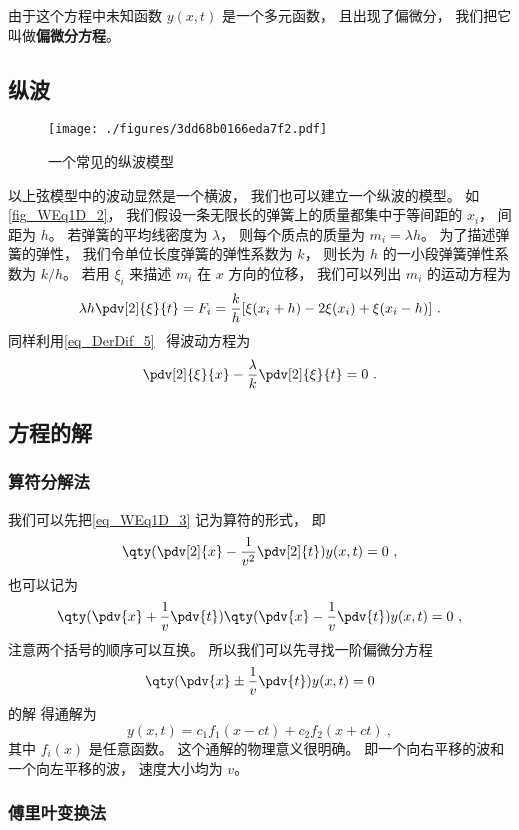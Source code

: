 由于这个方程中未知函数 $y(x,t)$ 是一个多元函数， 且出现了偏微分， 我们把它叫做\textbf{偏微分方程}。

\subsection{纵波}

\begin{figure}[ht]
\centering
\texttt{[image: ./figures/3dd68b0166eda7f2.pdf]}
\caption{一个常见的纵波模型} \label{fig_WEq1D_2}
\end{figure}

以上弦模型中的波动显然是一个横波， 我们也可以建立一个纵波的模型。 如\autoref{fig_WEq1D_2}， 我们假设一条无限长的弹簧上的质量都集中于等间距的 $x_i$， 间距为 $h$。 若弹簧的平均线密度为 $\lambda$， 则每个质点的质量为 $m_i = \lambda h$。 为了描述弹簧的弹性， 我们令单位长度弹簧的弹性系数为 $k$， 则长为 $h$ 的一小段弹簧弹性系数为 $k/h$。 若用 $\xi_i$ 来描述 $m_i$ 在 $x$ 方向的位移， 我们可以列出 $m_i$ 的运动方程为
\begin{equation}
\lambda h \pdv[2]{\xi}{t} = F_i = \frac kh [\xi(x_i + h) - 2\xi(x_i) + \xi(x_i - h)]~.
\end{equation}
同样利用\autoref{eq_DerDif_5}~ 得波动方程为
\begin{equation}
\pdv[2]{\xi}{x} - \frac{\lambda}{k}\pdv[2]{\xi}{t} = 0~.
\end{equation}

\subsection{方程的解}

\subsubsection{算符分解法}
我们可以先把\autoref{eq_WEq1D_3} 记为算符的形式， 即
\begin{equation}
\qty(\pdv[2]{x} - \frac{1}{v^2}\pdv[2]{t}) y(x, t) = 0~,
\end{equation}
也可以记为
\begin{equation}
\qty(\pdv{x} + \frac{1}{v}\pdv{t})\qty(\pdv{x} - \frac{1}{v}\pdv{t}) y(x, t) = 0~,
\end{equation}
注意两个括号的顺序可以互换。 所以我们可以先寻找一阶偏微分方程
\begin{equation}
\qty(\pdv{x}  \pm\frac{1}{v}\pdv{t})y(x, t)  = 0
\end{equation}
的解%
得通解为
\begin{equation}
y(x, t) = c_1 f_1(x - ct) + c_2 f_2(x + ct)~,
\end{equation}
其中 $f_i(x)$ 是任意函数。 这个通解的物理意义很明确。 即一个向右平移的波和一个向左平移的波， 速度大小均为 $v$。

\subsubsection{傅里叶变换法}
